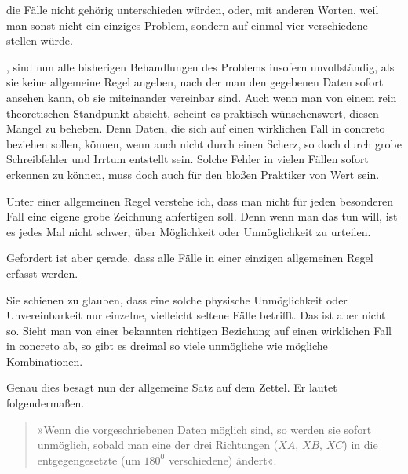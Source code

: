 \begin{center}\hspace{.8cm}\end{center}

die Fälle nicht gehörig unterschieden würden, oder, mit anderen Worten, weil man sonst nicht ein einziges Problem, sondern auf einmal vier verschiedene stellen würde.

, sind nun alle bisherigen Behandlungen des Problems insofern unvollständig, als sie keine allgemeine Regel angeben, nach der man den gegebenen Daten sofort ansehen kann, ob sie miteinander vereinbar sind. Auch wenn man von einem rein theoretischen Standpunkt absieht, scheint es praktisch wünschenswert, diesen Mangel zu beheben. Denn Daten, die sich auf einen wirklichen Fall in concreto beziehen sollen, können, wenn auch nicht durch einen Scherz, so doch durch grobe Schreibfehler und Irrtum entstellt sein. Solche Fehler in vielen Fällen sofort erkennen zu können, muss doch auch für den bloßen Praktiker von Wert sein.

Unter einer allgemeinen Regel verstehe ich, dass man nicht für jeden besonderen Fall eine eigene grobe Zeichnung anfertigen soll. Denn wenn man das tun will, ist es jedes Mal nicht schwer, über Möglichkeit oder Unmöglichkeit zu urteilen.

Gefordert ist aber gerade, dass alle Fälle in einer einzigen allgemeinen Regel erfasst werden.

Sie schienen zu glauben, dass eine solche physische Unmöglichkeit oder Unvereinbarkeit nur einzelne, vielleicht seltene Fälle betrifft. Das ist aber nicht so. Sieht man von einer bekannten richtigen Beziehung auf einen wirklichen Fall in concreto ab, so gibt es dreimal so viele unmögliche wie mögliche Kombinationen.

Genau dies besagt nun der allgemeine Satz auf dem Zettel. Er lautet folgendermaßen.

\begin{quote}»Wenn die vorgeschriebenen Daten möglich sind, so werden sie sofort unmöglich, sobald man eine der drei Richtungen ($XA$, $XB$, $XC$) in die entgegengesetzte (um $180^0$ verschiedene) ändert«.\end{quote}
